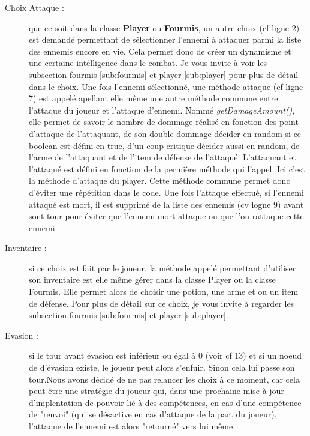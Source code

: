 		\begin{description}
			\item[Choix Attaque :]{que ce soit dans la classe \textbf{Player} ou \textbf{Fourmis}, un autre choix (cf ligne 2) est demandé permettant de sélectionner l'ennemi à attaquer parmi la liste des ennemis encore en vie. Cela permet donc de créer un dynamisme et une certaine intélligence dans le combat. Je vous invite à voir les subsection fourmis \ref{sub:fourmis} et player \ref{sub:player} pour plus de détail dans le choix.
			 Une fois l'ennemi sélectionné, une méthode attaque (cf ligne 7) est appelé apellant elle même une autre méthode commune entre l'attaque du joueur et l'attaque d'ennemi. Nommé \textit{getDamageAmount()}, elle permet de savoir le nombre de dommage réalisé en fonction des point d'attaque de l'attaquant, de son double dommage décider en random si ce boolean est défini en true, d'un coup critique décider aussi en random, de l'arme de l'attaquant et de l'item de défense de l'attaqué. L'attaquant et l'attaqué est défini en fonction de la permière méthode qui l'appel. Ici c'est la méthode d'attaque du player. Cette méthode commune permet donc d'éviter une répétition dans le code.}
			Une fois l'attaque effectué, si l'ennemi attaqué est mort, il est supprimé de la liste des ennemis (cv logne 9) avant sont tour pour éviter que l'ennemi mort attaque ou que l'on rattaque cette ennemi.
			\item[Inventaire :]{si ce choix est fait par le joueur, la méthode appelé permettant d'utiliser son inventaire est elle même gérer dans la classe Player ou la classe Fourmis. Elle permet alors de choisir une potion, une arme et ou un item de défense. Pour plus de détail sur ce choix, je vous invite à regarder les subsection fourmis \ref{sub:fourmis} et player \ref{sub:player}.}
			\item[Evasion :]{si le tour avant évasion est inférieur ou égal à 0 (voir cf 13) et si un noeud de d'évasion existe, le joueur peut alors s'enfuir. Sinon cela lui passe son tour.Nous avons décidé de ne pas relancer les choix à ce moment, car cela peut être une stratégie du joueur qui, dans une prochaine mise à jour d'implentation de pouvoir lié à des compétences, en cas d'une compétence de "renvoi" (qui se désactive en cas d'attaque de la part du joueur), l'attaque de l'ennemi est alors "retourné" vers lui même.}
		\end{description}

